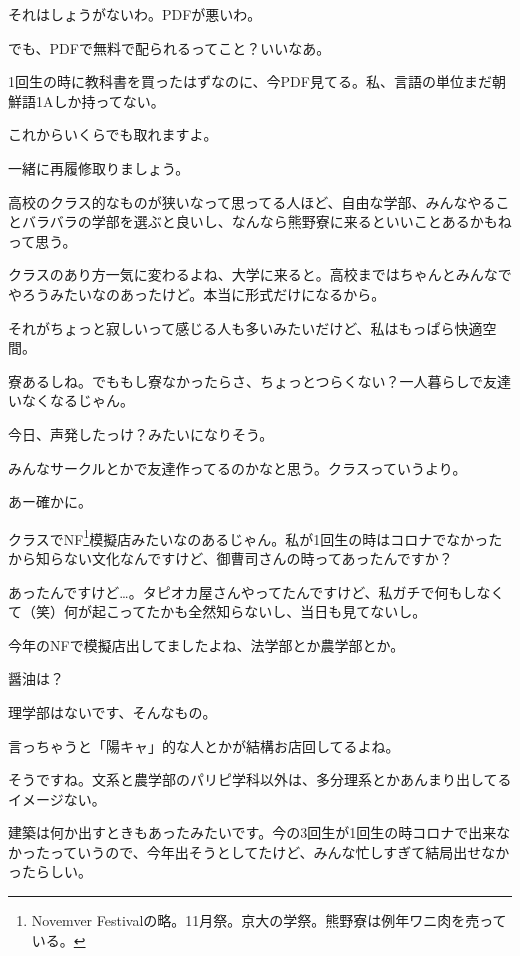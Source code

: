 \begin{multicols}{2}
  それはしょうがないわ。PDFが悪いわ。

  でも、PDFで無料で配られるってこと？いいなあ。

  1回生の時に教科書を買ったはずなのに、今PDF見てる。私、言語の単位まだ朝鮮語1Aしか持ってない。

  これからいくらでも取れますよ。

  一緒に再履修取りましょう。


  高校のクラス的なものが狭いなって思ってる人ほど、自由な学部、みんなやることバラバラの学部を選ぶと良いし、なんなら熊野寮に来るといいことあるかもねって思う。

  クラスのあり方一気に変わるよね、大学に来ると。高校まではちゃんとみんなでやろうみたいなのあったけど。本当に形式だけになるから。

  それがちょっと寂しいって感じる人も多いみたいだけど、私はもっぱら快適空間。

  寮あるしね。でももし寮なかったらさ、ちょっとつらくない？一人暮らしで友達いなくなるじゃん。

  今日、声発したっけ？みたいになりそう。

  みんなサークルとかで友達作ってるのかなと思う。クラスっていうより。

  あー確かに。

  クラスでNF\footnote{ Novemver Festivalの略。11月祭。京大の学祭。熊野寮は例年ワニ肉を売っている。}模擬店みたいなのあるじゃん。私が1回生の時はコロナでなかったから知らない文化なんですけど、御曹司さんの時ってあったんですか？

  あったんですけど…。タピオカ屋さんやってたんですけど、私ガチで何もしなくて（笑）何が起こってたかも全然知らないし、当日も見てないし。

  今年のNFで模擬店出してましたよね、法学部とか農学部とか。

  醤油は？

  理学部はないです、そんなもの。

  言っちゃうと「陽キャ」的な人とかが結構お店回してるよね。

  そうですね。文系と農学部のパリピ学科以外は、多分理系とかあんまり出してるイメージない。

  建築は何か出すときもあったみたいです。今の3回生が1回生の時コロナで出来なかったっていうので、今年出そうとしてたけど、みんな忙しすぎて結局出せなかったらしい。


\end{multicols}
